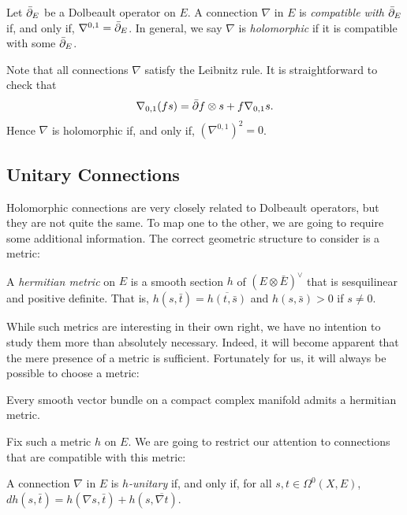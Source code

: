 \documentclass[12pt]{ociamthesis}  %
\begin{document}
\begin{definition}
  Let $\bar{\partial}_E$ be a Dolbeault operator on $E$.
  A connection $\nabla$ in $E$ is \emph{compatible with $\bar{\partial}_E$}
  if, and only if, $\nabla^{0,1} = \bar{\partial}_E$. In general, we say
  $\nabla$ is \emph{holomorphic} if it is compatible with some
  $\bar{\partial}_E$.
\end{definition}

Note that all connections $\nabla$ satisfy the Leibnitz rule. It is
straightforward to check that
\begin{align*}
  \nabla_{0,1} (fs) = \bar{\partial} f\otimes s + f \nabla_{0,1} s.
\end{align*}
Hence $\nabla$ is holomorphic if, and only if, $(\nabla^{0,1})^2 = 0$.

\subsection{Unitary Connections}

Holomorphic connections are very closely related to Dolbeault operators,
but they are not quite the same. To map one to the other, we are going
to require some additional information. The correct geometric
structure to consider is a metric:

\begin{definition}
  A \emph{hermitian metric} on $E$ is a smooth section $h$ of
  $(E\otimes\bar E)^\vee$ that is sesquilinear and positive definite.
  That is, $h(s,\bar t) = \overline{h(t,\bar s)}$ and $h(s,\bar s) > 0$
  if $s \neq 0$.
\end{definition}

While such metrics are interesting in their own right, we have no
intention to study them more than absolutely necessary. Indeed, it will
become apparent that the mere presence of a metric is sufficient.
Fortunately for us, it will always be possible to choose a metric:

\begin{theorem}\missingcitation
  Every smooth vector bundle on a compact complex manifold admits a
  hermitian metric.
\end{theorem}

Fix such a metric $h$ on $E$. We are going to restrict our attention to
connections that are compatible with this metric:

\begin{definition}
  A connection $\nabla$ in $E$ is \emph{$h$-unitary}
  if, and only if, for all $s,t\in\Omega^0(X,E)$,
  $dh(s,\bar t) = h(\nabla s,\bar t) + h(s,\overline{\nabla t})$.
\end{definition}
\end{document}
